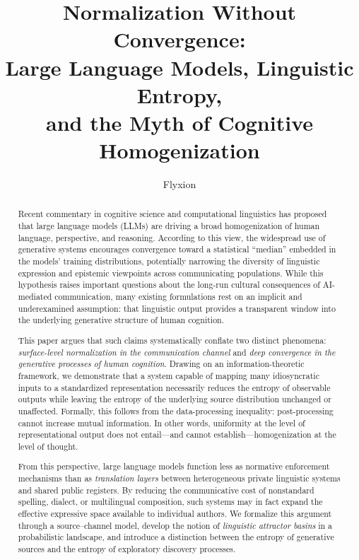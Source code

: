 \documentclass[12pt,a4paper]{article}
\title{Normalization Without Convergence:\\[6pt]
Large Language Models, Linguistic Entropy,\\
and the Myth of Cognitive Homogenization}
\author{Flyxion}
\date{}
\theoremstyle{definition}
\theoremstyle{plain}
\theoremstyle{remark}
\begin{document}
\maketitle

\begin{abstract}
Recent commentary in cognitive science and computational linguistics has proposed that large
language models (LLMs) are driving a broad homogenization of human language, perspective, and
reasoning. According to this view, the widespread use of generative systems encourages
convergence toward a statistical ``median'' embedded in the models' training distributions,
potentially narrowing the diversity of linguistic expression and epistemic viewpoints across
communicating populations. While this hypothesis raises important questions about the
long-run cultural consequences of AI-mediated communication, many existing formulations rest
on an implicit and underexamined assumption: that linguistic output provides a transparent
window into the underlying generative structure of human cognition.

This paper argues that such claims systematically conflate two distinct phenomena:
\emph{surface-level normalization in the communication channel} and \emph{deep convergence in
the generative processes of human cognition}. Drawing on an information-theoretic framework,
we demonstrate that a system capable of mapping many idiosyncratic inputs to a standardized
representation necessarily reduces the entropy of observable outputs while leaving the entropy
of the underlying source distribution unchanged or unaffected. Formally, this follows from
the data-processing inequality: post-processing cannot increase mutual information. In other
words, uniformity at the level of representational output does not entail---and cannot
establish---homogenization at the level of thought.

From this perspective, large language models function less as normative enforcement mechanisms
than as \emph{translation layers} between heterogeneous private linguistic systems and shared
public registers. By reducing the communicative cost of nonstandard spelling, dialect, or
multilingual composition, such systems may in fact expand the effective expressive space
available to individual authors. We formalize this argument through a source--channel model,
develop the notion of \emph{linguistic attractor basins} in a probabilistic landscape, and
introduce a distinction between the entropy of generative sources and the entropy of
exploratory discovery processes.


\end{abstract}
\end{document}
